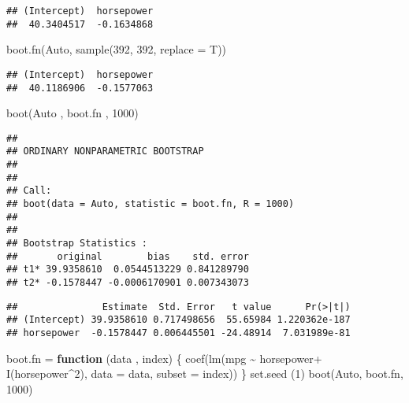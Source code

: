\documentclass[
]{article}
\newenvironment{Shaded}{\begin{snugshade}}{\end{snugshade}}
\newcommand{\AttributeTok}[1]{\textcolor[rgb]{0.77,0.63,0.00}{#1}}
\newcommand{\ControlFlowTok}[1]{\textcolor[rgb]{0.13,0.29,0.53}{\textbf{#1}}}
\newcommand{\DecValTok}[1]{\textcolor[rgb]{0.00,0.00,0.81}{#1}}
\newcommand{\FunctionTok}[1]{\textcolor[rgb]{0.00,0.00,0.00}{#1}}
\newcommand{\NormalTok}[1]{#1}
\newcommand{\OtherTok}[1]{\textcolor[rgb]{0.56,0.35,0.01}{#1}}
\newcommand{\SpecialCharTok}[1]{\textcolor[rgb]{0.00,0.00,0.00}{#1}}
\begin{document}
\begin{verbatim}
## (Intercept)  horsepower 
##  40.3404517  -0.1634868
\end{verbatim}

\begin{Shaded}
\begin{Highlighting}[]
\FunctionTok{boot.fn}\NormalTok{(Auto, }\FunctionTok{sample}\NormalTok{(}\DecValTok{392}\NormalTok{, }\DecValTok{392}\NormalTok{, }\AttributeTok{replace =}\NormalTok{ T))}
\end{Highlighting}
\end{Shaded}

\begin{verbatim}
## (Intercept)  horsepower 
##  40.1186906  -0.1577063
\end{verbatim}

\begin{Shaded}
\begin{Highlighting}[]
\FunctionTok{boot}\NormalTok{(Auto , boot.fn , }\DecValTok{1000}\NormalTok{)}
\end{Highlighting}
\end{Shaded}

\begin{verbatim}
## 
## ORDINARY NONPARAMETRIC BOOTSTRAP
## 
## 
## Call:
## boot(data = Auto, statistic = boot.fn, R = 1000)
## 
## 
## Bootstrap Statistics :
##       original        bias    std. error
## t1* 39.9358610  0.0544513229 0.841289790
## t2* -0.1578447 -0.0006170901 0.007343073
\end{verbatim}

\begin{Shaded}
\end{Shaded}

\begin{verbatim}
##               Estimate  Std. Error   t value      Pr(>|t|)
## (Intercept) 39.9358610 0.717498656  55.65984 1.220362e-187
## horsepower  -0.1578447 0.006445501 -24.48914  7.031989e-81
\end{verbatim}

\begin{Shaded}
\begin{Highlighting}[]
\NormalTok{boot.fn }\OtherTok{=} \ControlFlowTok{function}\NormalTok{ (data , index) \{}
  \FunctionTok{coef}\NormalTok{(}\FunctionTok{lm}\NormalTok{(mpg }\SpecialCharTok{\textasciitilde{}}\NormalTok{ horsepower}\SpecialCharTok{+} \FunctionTok{I}\NormalTok{(horsepower}\SpecialCharTok{\^{}}\DecValTok{2}\NormalTok{), }\AttributeTok{data =}\NormalTok{ data, }\AttributeTok{subset =}\NormalTok{ index))}
\NormalTok{\}}
\FunctionTok{set.seed}\NormalTok{ (}\DecValTok{1}\NormalTok{)}
\FunctionTok{boot}\NormalTok{(Auto, boot.fn, }\DecValTok{1000}\NormalTok{)}
\end{Highlighting}
\end{Shaded}
\end{document}
